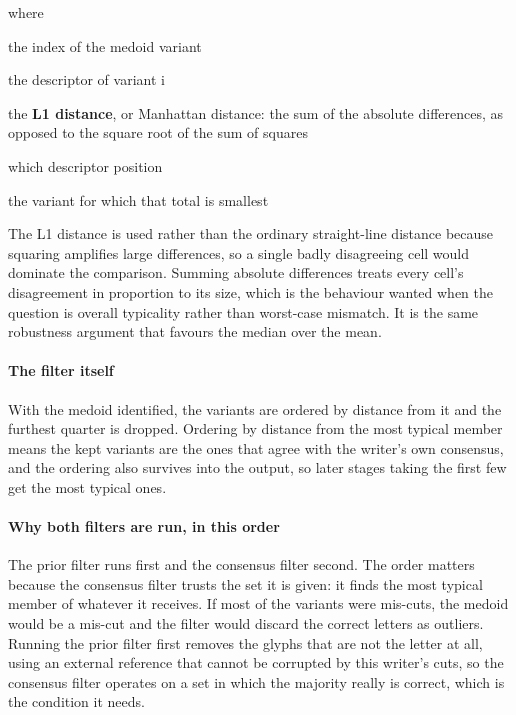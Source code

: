 \noindent where
\begin{description}[leftmargin=2.4em,style=nextline,font=\normalfont\ttfamily]\setlength\itemsep{1pt}
  \item[{$m$}] \normalfont the index of the medoid variant
  \item[{$\mathbf{v}^{(i)}$}] \normalfont the descriptor of variant i
  \item[{$\|\cdot\|_{1}$}] \normalfont the \textbf{L1 distance}, or Manhattan distance: the sum of the absolute differences, as opposed to the square root of the sum of squares
  \item[{$k$}] \normalfont which descriptor position
  \item[{$\arg\min_i$}] \normalfont the variant for which that total is smallest
\end{description}
The L1 distance is used rather than the ordinary straight-line distance because squaring amplifies large differences, so a single badly disagreeing cell would dominate the comparison. Summing absolute differences treats every cell's disagreement in proportion to its size, which is the behaviour wanted when the question is overall typicality rather than worst-case mismatch. It is the same robustness argument that favours the median over the mean.


\paragraph{The filter itself}
With the medoid identified, the variants are ordered by distance from it and the furthest quarter is dropped. Ordering by distance from the most typical member means the kept variants are the ones that agree with the writer's own consensus, and the ordering also survives into the output, so later stages taking the first few get the most typical ones.


\paragraph{Why both filters are run, in this order}
The prior filter runs first and the consensus filter second. The order matters because the consensus filter trusts the set it is given: it finds the most typical member of whatever it receives. If most of the variants were mis-cuts, the medoid would be a mis-cut and the filter would discard the correct letters as outliers. Running the prior filter first removes the glyphs that are not the letter at all, using an external reference that cannot be corrupted by this writer's cuts, so the consensus filter operates on a set in which the majority really is correct, which is the condition it needs.


